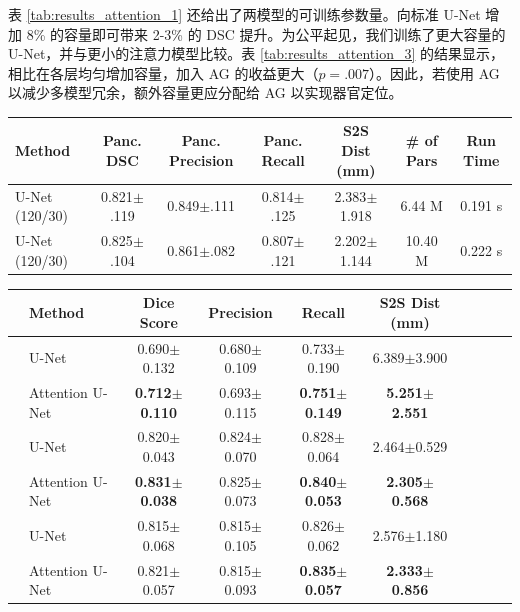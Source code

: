 \documentclass{article}
\begin{document}
表 \ref{tab:results_attention_1} 还给出了两模型的可训练参数量。向标准 U-Net 增加 8\% 的容量即可带来 2-3\% 的 DSC 提升。为公平起见，我们训练了更大容量的 U-Net，并与更小的注意力模型比较。表 \ref{tab:results_attention_3} 的结果显示，相比在各层均匀增加容量，加入 AG 的收益更大（$p=.007$）。因此，若使用 AG 以减少多模型冗余，额外容量更应分配给 AG 以实现器官定位。
\begin{table}[t]\footnotesize
	\parbox{\textwidth}{
		\centering
		\label{tab:results_attention_3}
		\vspace{1 mm}
		\begin{tabular}{@{\extracolsep{1pt}}lcccccc@{}} 
			Method  & Panc. DSC & Panc. Precision & Panc. Recall & S2S Dist (mm) &\# of Pars & Run Time   \\ \midrule
			U-Net (120/30) & 0.821$\pm$.119 & 0.849$\pm$.111 & 0.814$\pm$.125 & 2.383$\pm$1.918 & 6.44 M & 0.191 s\\
			U-Net (120/30) & 0.825$\pm$.104 & 0.861$\pm$.082 & 0.807$\pm$.121 & 2.202$\pm$1.144 & 10.40 M &  0.222 s\\
			\midrule
		\end{tabular}
		\label{tab:results_attention_4}
		\vspace{1 mm}
		\begin{tabular}{@{\extracolsep{1pt}}llcccccccc@{}} 
			& Method  & Dice Score & Precision & Recall & S2S Dist (mm)  \\ \midrule
			\parbox[t]{2mm}{}
			& U-Net \cite{ronneberger2015u} & 0.690$\pm$0.132 & 0.680$\pm$0.109 & 0.733$\pm$0.190 & 6.389$\pm$3.900\\
			& Attention U-Net & \textbf{0.712$\pm$0.110} & 0.693$\pm$0.115 & \textbf{0.751$\pm$0.149} & \textbf{5.251$\pm$2.551}\\
			\midrule
			\parbox[t]{2mm}{}
			& U-Net \cite{ronneberger2015u} & 0.820$\pm$0.043 & 0.824$\pm$0.070 & 0.828$\pm$0.064 & 2.464$\pm$0.529\\
			& Attention U-Net & \textbf{0.831$\pm$0.038} & 0.825$\pm$0.073 & \textbf{0.840$\pm$0.053} &  \textbf{2.305$\pm$0.568}\\ 
			\midrule
			\parbox[t]{2mm}{}
			& U-Net \cite{ronneberger2015u} & 0.815$\pm$0.068 & 0.815$\pm$0.105 & 0.826$\pm$0.062 & 2.576$\pm$1.180 \\
			& Attention U-Net & 0.821$\pm$0.057 & 0.815$\pm$0.093 & \textbf{0.835$\pm$0.057} & \textbf{2.333$\pm$0.856} \\
			\midrule
		\end{tabular}
	}
\end{table}
\end{document}
